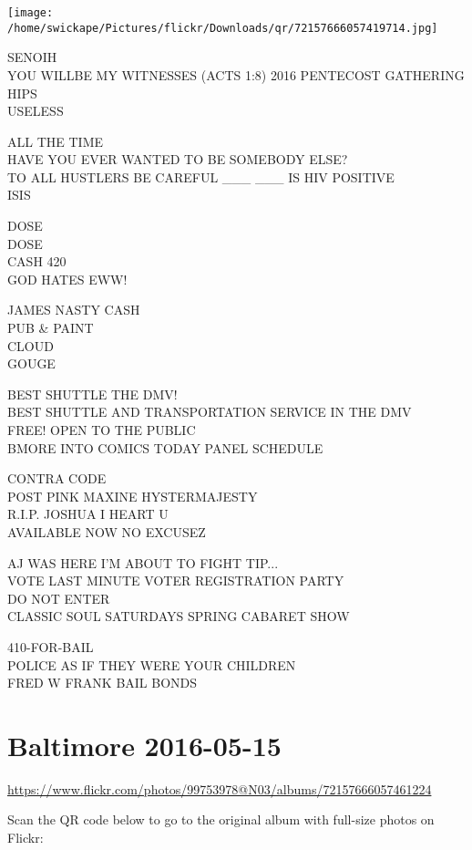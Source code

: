 \documentclass[10pt,letterpaper]{article}
\begin{document}
\texttt{[image: /home/swickape/Pictures/flickr/Downloads/qr/72157666057419714.jpg]}


SENOIH\\
YOU WILLBE MY WITNESSES (ACTS 1:8) 2016 PENTECOST GATHERING\\
HIPS\\
USELESS

ALL THE TIME\\
HAVE YOU EVER WANTED TO BE SOMEBODY ELSE?\\
TO ALL HUSTLERS BE CAREFUL \_\_\_ \_\_\_ IS HIV POSITIVE\\
ISIS

DOSE\\
DOSE\\
CASH 420\\
GOD HATES EWW!

JAMES NASTY CASH\\
PUB \& PAINT\\
CLOUD\\
GOUGE

BEST SHUTTLE THE DMV!\\
BEST SHUTTLE AND TRANSPORTATION SERVICE IN THE DMV\\
FREE!  OPEN TO THE PUBLIC\\
BMORE INTO COMICS TODAY PANEL SCHEDULE

CONTRA CODE\\
POST PINK MAXINE HYSTERMAJESTY\\
R.I.P. JOSHUA I HEART U\\
AVAILABLE NOW NO EXCUSEZ

AJ WAS HERE I'M ABOUT TO FIGHT TIP...\\
VOTE LAST MINUTE VOTER REGISTRATION PARTY\\
DO NOT ENTER\\
CLASSIC SOUL SATURDAYS SPRING CABARET SHOW

410{-}FOR{-}BAIL\\
POLICE AS IF THEY WERE YOUR CHILDREN\\
FRED W FRANK BAIL BONDS


\section*{Baltimore 2016-05-15}

\url{https://www.flickr.com/photos/99753978@N03/albums/72157666057461224}

Scan the QR code below to go to the original album with full-size photos on Flickr:
\end{document}
